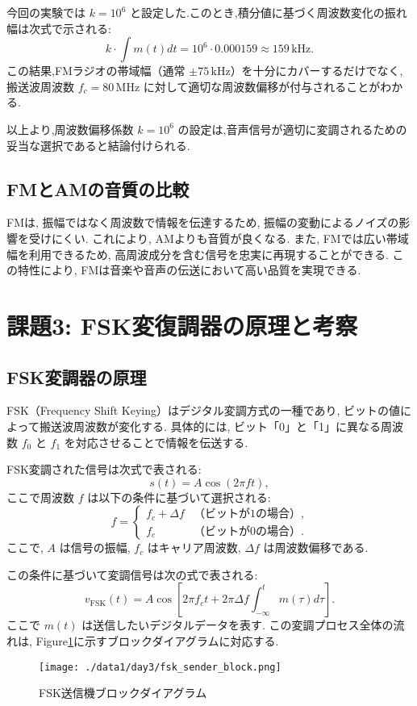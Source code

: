 \documentclass[a4paper, twocolumn]{article} %
\begin{document}
今回の実験では \(k = 10^6\) と設定した.このとき,積分値に基づく周波数変化の振れ幅は次式で示される:
\[
k \cdot \int m(t) dt = 10^6 \cdot 0.000159 \approx 159\,\mathrm{kHz}.
\]
この結果,FMラジオの帯域幅（通常 \(\pm 75\,\mathrm{kHz}\)）を十分にカバーするだけでなく,搬送波周波数 \(f_c = 80\,\mathrm{MHz}\) に対して適切な周波数偏移が付与されることがわかる.

以上より,周波数偏移係数 \(k = 10^6\) の設定は,音声信号が適切に変調されるための妥当な選択であると結論付けられる.

\subsection{FMとAMの音質の比較}
FMは, 振幅ではなく周波数で情報を伝達するため, 振幅の変動によるノイズの影響を受けにくい. これにより, AMよりも音質が良くなる. また, FMでは広い帯域幅を利用できるため, 高周波成分を含む信号を忠実に再現することができる. この特性により, FMは音楽や音声の伝送において高い品質を実現できる.

\section{課題3: FSK変復調器の原理と考察}
\subsection{FSK変調器の原理}
FSK（Frequency Shift Keying）はデジタル変調方式の一種であり, ビットの値によって搬送波周波数が変化する. 具体的には, ビット「0」と「1」に異なる周波数 \(f_0\) と \(f_1\) を対応させることで情報を伝送する.

FSK変調された信号は次式で表される:
\[
s(t) = A \cos \left( 2\pi f t \right),
\]
ここで周波数 \(f\) は以下の条件に基づいて選択される:
\[
f = 
\begin{cases} 
f_c + \Delta f & \text{（ビットが1の場合）}, \\
f_c & \text{（ビットが0の場合）}.
\end{cases}
\]
ここで,
\(A\) は信号の振幅, \(f_c\) はキャリア周波数, \(\Delta f\) は周波数偏移である.

この条件に基づいて変調信号は次の式で表される:
\[
v_{\text{FSK}}(t) = A \cos \left[ 2\pi f_c t + 2\pi \Delta f \int_{-\infty}^{t} m(\tau) d\tau \right].
\]
ここで \(m(t)\) は送信したいデジタルデータを表す. この変調プロセス全体の流れは, Figure\ref{fig:fsk_sender_block}に示すブロックダイアグラムに対応する.

\begin{figure}[H]
    \centering
    \texttt{[image: ./data1/day3/fsk\_sender\_block.png]}
    \caption{FSK送信機ブロックダイアグラム}
    \label{fig:fsk_sender_block}
\end{figure}
\end{document}
